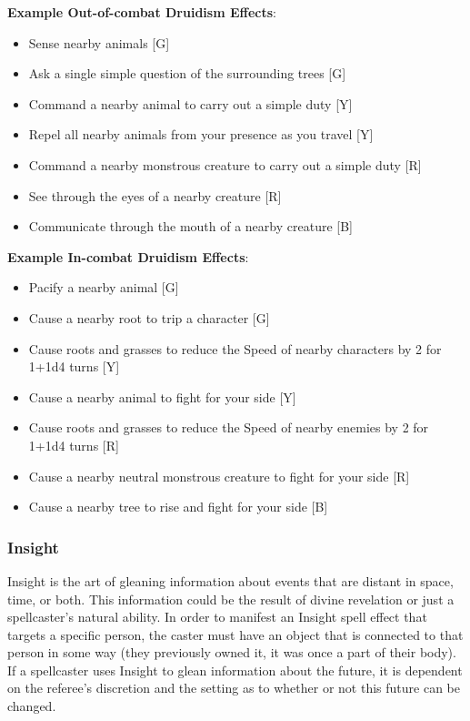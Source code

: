 \documentclass[oneside]{book}
\begin{document}
\begin{multicols}{2}
\textbf{Example Out-of-combat Druidism Effects}: 
	\begin{itemize}
		\setlength{\itemsep}{0cm}%
  		\setlength{\parskip}{0cm}%
		\item{ \small Sense nearby animals [G]}
		\item{ \small Ask a single simple question of the surrounding trees [G]}
		\item{ \small Command a nearby animal to carry out a simple duty [Y]}
		\item{ \small Repel all nearby animals from your presence as you travel [Y]}
		\item{ \small Command a nearby monstrous creature to carry out a simple duty [R]}
		\item{ \small See through the eyes of a nearby creature [R]}
		\item{ \small Communicate through the mouth of a nearby creature [B]}
	\end{itemize}
	
\textbf{Example In-combat Druidism Effects}: 
	\begin{itemize}
		\setlength{\itemsep}{0cm}%
  		\setlength{\parskip}{0cm}%
		\item{ \small Pacify a nearby animal [G]}
		\item{ \small Cause a nearby root to trip a character [G]}
		\item{ \small Cause roots and grasses to reduce the Speed of nearby characters by 2 for 1+1d4 turns [Y]}
		\item{ \small Cause a nearby animal to fight for your side [Y]}
		\item{ \small Cause roots and grasses to reduce the Speed of nearby enemies by 2 for 1+1d4 turns [R]}
		\item{ \small Cause a nearby neutral monstrous creature to fight for your side [R]}
		\item{ \small Cause a nearby tree to rise and fight for your side [B]}
	\end{itemize}

\subsubsection{Insight}
Insight is the art of gleaning information about events that are distant in space, time, or both. This information could be the result of divine revelation or just a spellcaster's natural ability. In order to manifest an Insight spell effect that targets a specific person, the caster must have an object that is connected to that person in some way (they previously owned it, it was once a part of their body). If a spellcaster uses Insight to glean information about the future, it is dependent on the referee's discretion and the setting as to whether or not this future can be changed.


\end{multicols}
\end{document}
